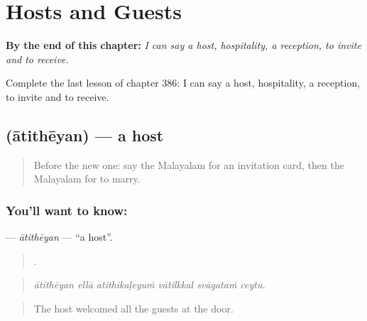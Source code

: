 
\chapter{Hosts and Guests}
\label{ch:ml-hosts-and-guests}

\begin{chapteropening}
\textbf{By the end of this chapter:} \emph{I can say a host, hospitality, a reception, to invite and to receive.}

Complete the last lesson of chapter 386: I can say a host, hospitality, a reception, to invite and to receive.
\end{chapteropening}

\section[\texorpdfstring{\ml{ആതിഥേയൻ} (ātithēyan)}{ആതിഥേയൻ (ātithēyan)}]{ (ātithēyan) — a host}

\label{lesson:ML-C386-atitheyan}



\begin{quote}
Before the new one: say the Malayalam for an invitation card, then the Malayalam for to marry.
\end{quote}

\subsection*{You'll want to know: }
\textbf{} — \emph{ātithēyan} — \textquotedblleft{}a host\textquotedblright{}.

\begin{quote}
     .
\end{quote}

\begin{quote}
\emph{ātithēyan ellā atithikaḷeyuṁ vātilkkal svāgataṁ ceytu.}
\end{quote}

\begin{quote}
The host welcomed all the guests at the door.
\end{quote}

